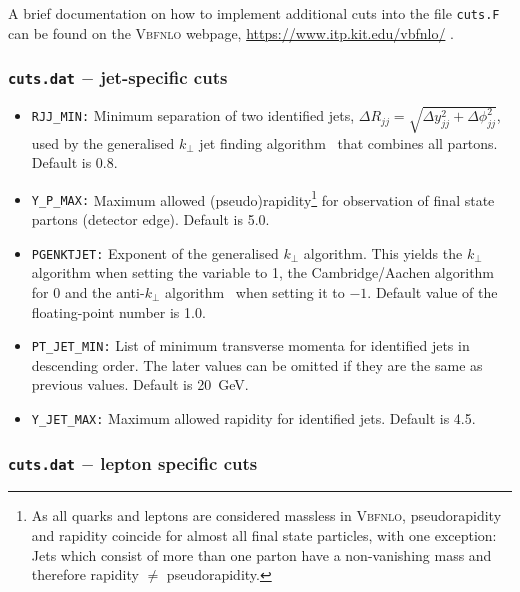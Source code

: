 \documentclass[english,12pt]{article}
\newcommand{\VBFNLO}{\textsc{Vbfnlo}}
\begin{document}
A brief documentation on how to implement additional cuts into the file {\tt cuts.F}
can be found on the \VBFNLO{} webpage,
\url{https://www.itp.kit.edu/vbfnlo/} .

\subsubsection{{\tt cuts.dat} $-$ jet-specific cuts}

\begin{itemize}
\item {\tt RJJ\_MIN:} Minimum separation of two identified jets, $\Delta R_{jj}=
\sqrt{\Delta y^{2}_{jj}+\Delta \phi^{2}_{jj}}$, used by the generalised
$k_\perp$ jet finding algorithm~\cite{Seymour:1997kj} that combines all partons.
 Default is 0.8.
\item {\tt Y\_P\_MAX:} Maximum allowed (pseudo)rapidity\footnote{As all quarks and leptons are considered massless in \textsc{Vbfnlo},
       pseudorapidity and rapidity coincide for almost all final state particles, with one exception: Jets which consist of more than one parton
       have a non-vanishing mass and therefore rapidity $\neq$ pseudorapidity.} for observation of final state 
partons (detector edge).  Default is 5.0.
\item {\tt PGENKTJET:} Exponent of the generalised $k_\perp$ algorithm.
  This yields the $k_\perp$ algorithm when setting
  the variable to 1, the Cambridge/Aachen
  algorithm~\cite{Dokshitzer:1997in} for 0 and the anti-$k_\perp$
  algorithm~\cite{Cacciari:2008gp} when setting it to $-1$. 
  Default value of the floating-point number is 1.0.
\item {\tt PT\_JET\_MIN:} List of minimum transverse momenta for identified jets
in descending order. The later values can be omitted if they are the same as
previous values. Default is 20~GeV.
\item {\tt Y\_JET\_MAX:} Maximum allowed rapidity for identified jets. 
Default is 4.5.
\end{itemize}

\subsubsection{{\tt cuts.dat} $-$ lepton specific cuts}
\end{document}
